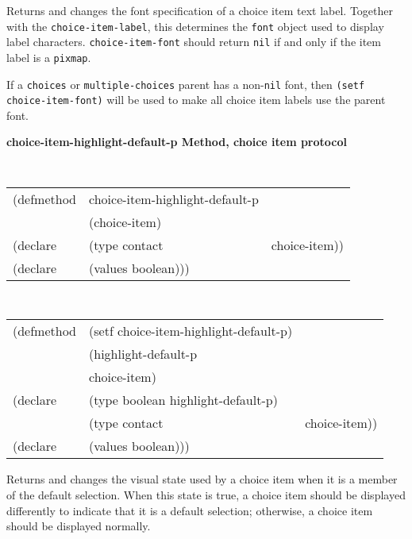 \begin{flushright} \parbox[t]{6.125in}{ Returns and changes the font
specification of a choice
item text label.  
Together
with the {\tt choice-item-label}, this determines the {\tt font}
object used to display label characters.
{\tt choice-item-font} should return {\tt nil} if and only if
the item label is a {\tt pixmap}.

If a {\tt choices} or {\tt multiple-choices} parent has a non-{\tt nil} font,
then {\tt (setf choice-item-font)} will be used to make all choice item labels
use the parent font.

}\end{flushright}
 
{\samepage
{\large {\bf choice-item-highlight-default-p \hfill Method, choice item protocol}}
\begin{flushright} \parbox[t]{6.125in}{
\tt
\begin{tabular}{lll}
\raggedright
(defmethod & choice-item-highlight-default-p & \\
& (choice-item) \\
(declare &(type contact & choice-item))\\
(declare & (values boolean)))
\end{tabular}
\rm

}\end{flushright}}

{\samepage
\begin{flushright} \parbox[t]{6.125in}{
\tt
\begin{tabular}{lll}
\raggedright
(defmethod & (setf choice-item-highlight-default-p) & \\
         & (highlight-default-p \\
         & choice-item) \\
(declare &(type boolean  highlight-default-p)\\
         &(type contact & choice-item))\\
(declare & (values boolean)))
\end{tabular}
\rm
}
\end{flushright}}

\begin{flushright} \parbox[t]{6.125in}{
Returns and changes the visual state used by a choice item when it is a
member of the default selection. When this state is true, a choice item should
be displayed
differently to indicate that it is a default selection; otherwise, a choice
item should be displayed normally.

}\end{flushright}

